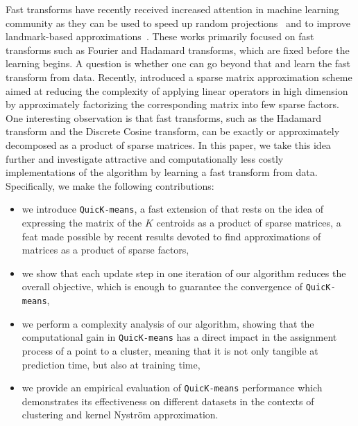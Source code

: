 Fast transforms have recently received increased attention in machine learning community as they can be used  to speed up random projections~\cite{le2013fastfood,gittens2016revisiting} and to improve landmark-based approximations~\cite{si2016computationally}.
%
These works primarily focused on fast transforms such as Fourier and Hadamard transforms, which are fixed before the learning begins. A question is whether one can go beyond that and learn the fast transform from data. 
%
Recently, \citet{LeMagoarou2016Flexible} introduced a sparse matrix approximation scheme aimed  at  reducing the  complexity  of  applying  linear  operators  in  high  dimension by   approximately   factorizing   the   corresponding   matrix   into few   sparse   factors. One interesting observation is that fast transforms, such as the  Hadamard  transform  and  the  Discrete  Cosine  transform, can be exactly or approximately decomposed as a product of sparse matrices.
%
In this paper, we take this idea further and investigate attractive and computationally less costly implementations of the \kmeans algorithm by learning a fast transform from data.
%
Specifically, we make the following contributions:
\begin{itemize}
	\item we introduce \texttt{QuicK-means}, a fast extension of \kmeans that rests on the idea of expressing the matrix of the $K$ centroids as a product of sparse matrices, a feat made possible by recent results devoted to find approximations of matrices as a product of sparse factors,
	\item we show that each update step in one iteration of our algorithm  reduces the overall objective, which is enough to guarantee the convergence of \texttt{QuicK-means},
	\item we perform a complexity analysis of our algorithm, showing that the computational gain in \texttt{QuicK-means}  has a direct impact in the assignment process of a point to a cluster, meaning that it is not only tangible at prediction time, but also at training time,
	\item we provide an empirical evaluation of \texttt{QuicK-means}  performance which demonstrates its effectiveness on different datasets in the contexts of clustering and kernel Nystr\"om approximation.
\end{itemize}



